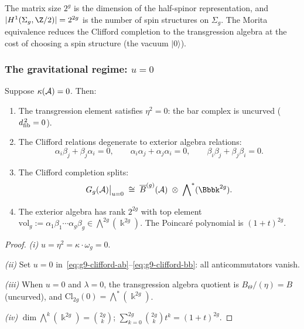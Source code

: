 \begin{remark}
\label{rem:g9-multiplicity}
The matrix size $2^g$ is the dimension of the half-spinor
representation, and $|H^1(\Sigma_g, \Z/2)| = 2^{2g}$ is the number of
spin structures on $\Sigma_g$. The Morita equivalence reduces the
Clifford completion to the transgression algebra at the cost of
choosing a spin structure (the vacuum $|0\rangle$).
\end{remark}

\subsubsection{The gravitational regime: $u = 0$}
\label{subsubsec:gravitational-regime}

\begin{theorem}
\label{thm:gravitational-regime}
Suppose $\kappa(\mathcal{A}) = 0$. Then:
\begin{enumerate}[label=\textup{(\roman*)}]
\item The transgression element satisfies $\eta^2 = 0$: the
bar complex is uncurved ($d_{\mathrm{fib}}^{\,2} = 0$).

\item The Clifford relations degenerate to exterior algebra relations:
\[
\alpha_i \beta_j + \beta_j \alpha_i = 0,
\qquad
\alpha_i \alpha_j + \alpha_j \alpha_i = 0,
\qquad
\beta_i \beta_j + \beta_j \beta_i = 0.
\]

\item The Clifford completion splits:
\begin{equation}\label{eq:g9-grav-tensor}
G_g(\cA)\big|_{u=0}
\;\cong\;
\barB^{(g)}(\cA)
\;\otimes\; \bigwedge\nolimits^*(\Bbbk^{2g}).
\end{equation}

\item The exterior algebra has rank $2^{2g}$ with top element
$\mathrm{vol}_g := \alpha_1 \beta_1 \cdots \alpha_g \beta_g
\in \bigwedge^{2g}(\Bbbk^{2g})$.
The Poincar\'e polynomial is $(1+t)^{2g}$.
\end{enumerate}
\end{theorem}

\begin{proof}
\emph{(i)} $u = \eta^2 = \kappa \cdot \omega_g = 0$.

\emph{(ii)} Set $u = 0$
in~\eqref{eq:g9-clifford-ab}--\eqref{eq:g9-clifford-bb}: all
anticommutators vanish.

\emph{(iii)} When $u = 0$ and $\lambda = 0$, the transgression
algebra quotient is $B_\Theta/(\eta) = B$ (uncurved), and
$\mathrm{Cl}_{2g}(0) = \bigwedge^*(\Bbbk^{2g})$.

\emph{(iv)} $\dim\bigwedge^k(\Bbbk^{2g}) = \binom{2g}{k}$;
$\sum_{k=0}^{2g}\binom{2g}{k}t^k = (1+t)^{2g}$.
\end{proof}

